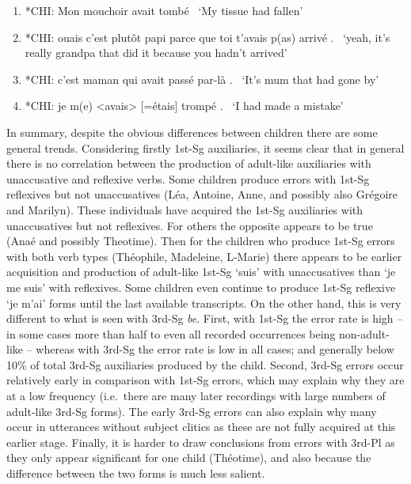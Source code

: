 \documentclass[
  12pt,
]{article}
\begin{document}
\begin{enumerate}[resume*]
\begin{enumerate}[resume*]
\begin{enumerate}[resume*]
\begin{enumerate}[resume*]
\begin{enumerate}[resume*]
\begin{enumerate}[resume*]
  \item{*CHI:   Mon mouchoir avait tombé \label{ex:imparfait-1}}\newline
  \     `My tissue had fallen'
  \item{*CHI:   ouais c'est plutôt papi parce que toi t'avais p(as) arrivé . \label{ex:imparfait-2}}\newline
  \     `yeah, it's really grandpa that did it because you hadn't arrived'
  \item{*CHI:   c'est maman qui avait passé par-là . \label{ex:imparfait-3}}\newline
  \     `It's mum that had gone by' 
  \item{*CHI:   je m(e) <avais> [=étais] trompé . \label{ex:imparfait-4}}\newline
  \     `I had made a mistake' 
\end{enumerate}

In summary, despite the obvious differences between children there are some general trends. Considering firstly 1st-Sg auxiliaries, it seems clear that in general there is no correlation between the production of adult-like auxiliaries with unaccusative and reflexive verbs. Some children produce errors with 1st-Sg reflexives but not unaccusatives (Léa, Antoine, Anne, and possibly also Grégoire and Marilyn). These individuals have acquired the 1st-Sg auxiliaries with unaccusatives but not reflexives. For others the opposite appears to be true (Anaé and possibly Theotime). Then for the children who produce 1st-Sg errors with both verb types (Théophile, Madeleine, L-Marie) there appears to be earlier acquisition and production of adult-like 1st-Sg `suis' with unaccusatives than `je me suis' with reflexives. Some children even continue to produce 1st-Sg reflexive `je m'ai' forms until the last available transcripts. On the other hand, this is very different to what is seen with 3rd-Sg \emph{be}. First, with 1st-Sg the error rate is high -- in some cases more than half to even all recorded occurrences being non-adult-like -- whereas with 3rd-Sg the error rate is low in all cases; and generally below 10\% of total 3rd-Sg auxiliaries produced by the child. Second, 3rd-Sg errors occur relatively early in comparison with 1st-Sg errors, which may explain why they are at a low frequency (i.e.~there are many later recordings with large numbers of adult-like 3rd-Sg forms). The early 3rd-Sg errors can also explain why many occur in utterances without subject clitics as these are not fully acquired at this earlier stage. Finally, it is harder to draw conclusions from errors with 3rd-Pl as they only appear significant for one child (Théotime), and also because the difference between the two forms is much less salient.


\end{enumerate}
\end{enumerate}
\end{enumerate}
\end{enumerate}
\end{enumerate}
\end{document}
